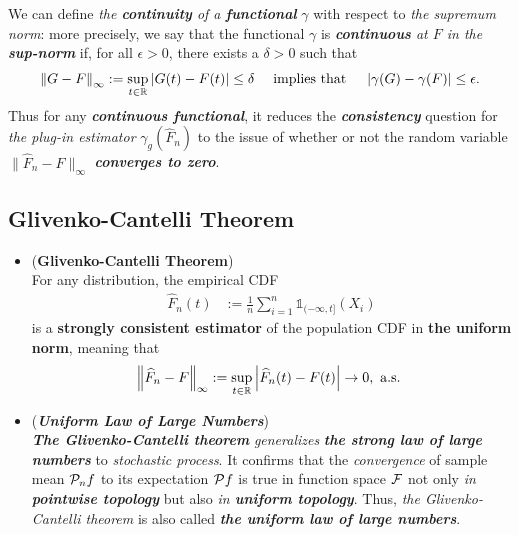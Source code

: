 \documentclass[11pt]{article}
\begin{document}
\begin{itemize}
\begin{remark}
We can define \emph{the \textbf{continuity} of a \textbf{functional}} $\gamma$ with respect to \emph{the supremum norm}: more precisely, we say that the functional $\gamma$ is \emph{\textbf{continuous} at $F$ in the \textbf{sup-norm}} if, for all $\epsilon > 0$, there exists a $\delta > 0$ such that 
\begin{align*}
\left\|G - F\right\|_{\infty} := \sup_{t\in {\mathbb R}}\left\lvert G(t) - F(t) \right\rvert \le \delta  \quad \text{ implies that }\quad \left\lvert \gamma(G) - \gamma(F) \right\rvert \le \epsilon.
\end{align*} 
Thus for any \emph{\textbf{continuous functional}}, it reduces the \emph{\textbf{consistency}} question for \emph{the plug-in estimator} $\gamma_g(\widehat{F}_n)$ to the issue of whether or not the random variable $\|\widehat{F}_n - F\|_{\infty}$ \emph{\textbf{converges to zero}}. 
\end{remark}
\end{itemize}
\subsection{Glivenko-Cantelli Theorem}
\begin{itemize}
\item \begin{theorem} (\textbf{Glivenko-Cantelli Theorem})  \citep{wellner2013weak, wainwright2019high, gine2021mathematical} \\ 
For any distribution, the empirical CDF 
\begin{align*}
\widehat{F}_n(t) &:=\frac{1}{n}\sum^{n}_{i=1}\mathds{1}_{(-\infty, t]}(X_i)
\end{align*}  is a \textbf{strongly consistent estimator} of the population CDF in \textbf{the uniform norm}, meaning that
\begin{align}
\left\|\widehat{F}_n - F\right\|_{\infty} := \sup_{t\in {\mathbb R}}\left\lvert \widehat{F}_n(t) - F(t) \right\rvert \rightarrow 0, \text{ a.s. } \label{eqn: gilvenko_cantelli}
\end{align}
\end{theorem}

\item \begin{remark}(\textbf{\emph{Uniform Law of Large Numbers}})\\
\emph{\textbf{The Glivenko-Cantelli theorem}} \emph{generalizes} \emph{\textbf{the strong law of large numbers}} to \emph{stochastic process}. It confirms that the \emph{convergence} of sample mean ${\mathcal P}_n f$ to its expectation ${\mathcal P} f$ is true in function space ${\mathcal F}$ not only \emph{in \textbf{pointwise topology}} but also \emph{in \textbf{uniform topology}}. Thus,  \emph{the Glivenko-Cantelli theorem} is also called \emph{\textbf{the uniform law of large numbers}}.
\end{remark}
\end{itemize}
\end{document}
